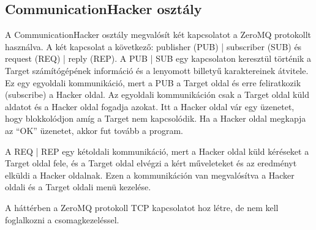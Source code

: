 \documentclass[12pt,a4paper,oneside]{report}
\begin{document}
\subsection{CommunicationHacker osztály}\label{subsubsec:serverclass}
A CommunicationHacker osztály megvalósít két kapcsolatot a ZeroMQ protokollt használva. A két kapcsolat a következő: publisher (PUB) | subscriber (SUB) és request (REQ) | reply (REP). A PUB | SUB egy kapcsolaton keresztül történik a Target számítógépének információ és a lenyomott billetyű karaktereinek átvitele. Ez egy egyoldali kommunikáció, mert a PUB a Target oldal és erre feliratkozik (subscribe) a Hacker oldal. Az egyoldali kommunikáción csak a Target oldal küld aldatot és a Hacker oldal fogadja azokat. Itt a Hacker oldal vár egy üzenetet, hogy blokkolódjon amíg a Target nem kapcsolódik. Ha a Hacker oldal megkapja az ``OK'' üzenetet, akkor fut tovább a program.

A REQ | REP egy kétoldali kommunikáció, mert a Hacker oldal küld kéréseket a Target oldal fele, és a Target oldal elvégzi a kért műveleteket és az eredményt elküldi a Hacker oldalnak. Ezen a kommunikáción van megvalósítva a Hacker oldali és a Target oldali menü kezelése.

A háttérben a ZeroMQ protokoll TCP kapcsolatot hoz létre, de nem kell foglalkozni a csomagkezeléssel.
\end{document}
